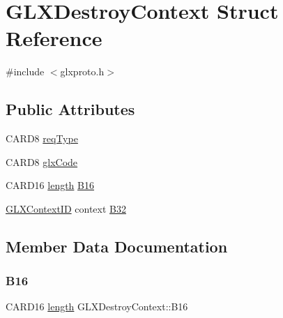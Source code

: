 \hypertarget{struct_g_l_x_destroy_context}{}\section{G\+L\+X\+Destroy\+Context Struct Reference}
\label{struct_g_l_x_destroy_context}


{\ttfamily \#include $<$glxproto.\+h$>$}

\subsection*{Public Attributes}
\begin{DoxyCompactItemize}
\item 
C\+A\+R\+D8 \hyperlink{struct_g_l_x_destroy_context_ad69f27a1810249465c5105e81fa5b1fb}{req\+Type}
\item 
C\+A\+R\+D8 \hyperlink{struct_g_l_x_destroy_context_ab916c49b3bda94a7c7399c60147a8a33}{glx\+Code}
\item 
C\+A\+R\+D16 \hyperlink{glcorearb_8h_ab9c919755bde3b34349e23a32b4e0fa7}{length} \hyperlink{struct_g_l_x_destroy_context_a3f5a8ca6f5f9f1bb92d7c3fa23d5a0aa}{B16}
\item 
\hyperlink{glx_8h_a17c7ca5b76cc448032df0b5352803005}{G\+L\+X\+Context\+ID} context \hyperlink{struct_g_l_x_destroy_context_ab54c139fdf1e241b7f129baa28026c85}{B32}
\end{DoxyCompactItemize}


\subsection{Member Data Documentation}
\mbox{\label{struct_g_l_x_destroy_context_a3f5a8ca6f5f9f1bb92d7c3fa23d5a0aa}} 
\subsubsection{\texorpdfstring{B16}{B16}}
{\footnotesize\ttfamily C\+A\+R\+D16 \hyperlink{glcorearb_8h_ab9c919755bde3b34349e23a32b4e0fa7}{length} G\+L\+X\+Destroy\+Context\+::\+B16}

\mbox{\label{struct_g_l_x_destroy_context_ab54c139fdf1e241b7f129baa28026c85}} 

